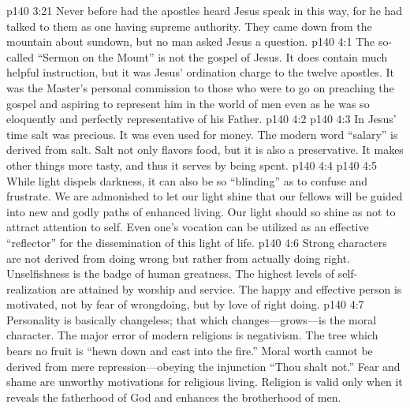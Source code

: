 \pc \vs p140 3:21 Never before had the apostles heard Jesus speak in this way, for he had talked to them as one having supreme authority. They came down from the mountain about sundown, but no man asked Jesus a question.
\vs p140 4:1 The so\hyp{}called “Sermon on the Mount” is not the gospel of Jesus. It does contain much helpful instruction, but it was Jesus’ ordination charge to the twelve apostles. It was the Master’s personal commission to those who were to go on preaching the gospel and aspiring to represent him in the world of men even as he was so eloquently and perfectly representative of his Father.
\pc \vs p140 4:2 
\vs p140 4:3 In Jesus’ time salt was precious. It was even used for money. The modern word “salary” is derived from salt. Salt not only flavors food, but it is also a preservative. It makes other things more tasty, and thus it serves by being spent.
\pc \vs p140 4:4 
\vs p140 4:5 While light dispels darkness, it can also be so “blinding” as to confuse and frustrate. We are admonished to let our light  shine that our fellows will be guided into new and godly paths of enhanced living. Our light should so shine as not to attract attention to self. Even one’s vocation can be utilized as an effective “reflector” for the dissemination of this light of life.
\vs p140 4:6 Strong characters are not derived from  doing wrong but rather from actually doing right. Unselfishness is the badge of human greatness. The highest levels of self\hyp{}realization are attained by worship and service. The happy and effective person is motivated, not by fear of wrongdoing, but by love of right doing.
\pc \vs p140 4:7  Personality is basically changeless; that which changes---grows---is the moral character. The major error of modern religions is negativism. The tree which bears no fruit is \textcolor{ubdarkred}{“hewn down and cast into the fire.”} Moral worth cannot be derived from mere repression---obeying the injunction “Thou shalt not.” Fear and shame are unworthy motivations for religious living. Religion is valid only when it reveals the fatherhood of God and enhances the brotherhood of men.
